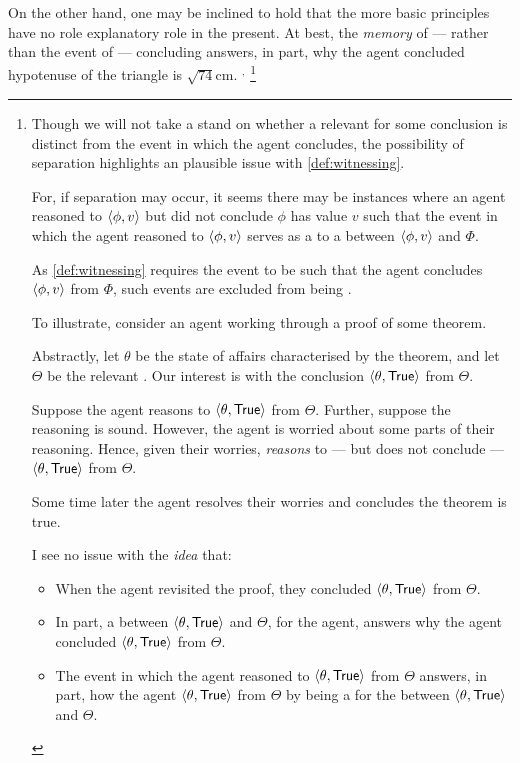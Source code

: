 \begin{note}
{    On the other hand, one may be inclined to hold that the more basic principles have no role explanatory role in the present.
    At best, the \agents{} \emph{memory} of --- rather than the event of --- concluding answers, in part, why the agent concluded hypotenuse of the triangle is \(\sqrt{74}\text{cm}\).
  }%
  \(^{,}\)%
  \footnote{
  Though we will not take a stand on whether a relevant  for some conclusion is distinct from the event in which the agent concludes, the possibility of separation highlights an plausible issue with \autoref{def:witnessing}.

  For, if separation may occur, it seems there may be instances where an agent reasoned to \(\langle \phi, v \rangle\) but did not conclude \(\phi\) has value \(v\) such that the event in which the agent reasoned to \(\langle \phi, v \rangle\) serves as a  to a \ros{} between \(\langle \phi, v \rangle\) and \(\Phi\).

  As \autoref{def:witnessing} requires the event to be such that the agent concludes \(\langle \phi, v \rangle\) from \(\Phi\), such events are excluded from being .

  To illustrate, consider an agent working through a proof of some theorem.

  Abstractly, let \(\theta\) be the state of affairs characterised by the theorem, and let \(\Theta\) be the relevant \pool{}.
  Our interest is with the conclusion \(\langle \theta, \text{\textsf{True}} \rangle\) from \(\Theta\).

  Suppose the agent reasons to \(\langle \theta, \text{\textsf{True}} \rangle\) from \(\Theta\).
  Further, suppose the \agents{} reasoning is sound.
  However, the agent is worried about some parts of their reasoning.
  Hence, given their worries, \emph{reasons} to --- but does not conclude --- \(\langle \theta, \text{\textsf{True}} \rangle\) from \(\Theta\).

  Some time later the agent resolves their worries and concludes the theorem is true.

  I see no issue with the \emph{idea} that:
  \begin{itemize}[noitemsep]
  \item
    When the agent revisited the proof, they concluded \(\langle \theta, \text{\textsf{True}} \rangle\) from \(\Theta\).
  \item
    In part, a \ros{} between \(\langle \theta, \text{\textsf{True}} \rangle\) and \(\Theta\), for the agent, answers why the agent concluded \(\langle \theta, \text{\textsf{True}} \rangle\) from \(\Theta\).
  \item
    The event in which the agent reasoned to \(\langle \theta, \text{\textsf{True}} \rangle\) from \(\Theta\) answers, in part, how the agent \(\langle \theta, \text{\textsf{True}} \rangle\) from \(\Theta\) by being a \wit{} for the \ros{} between \(\langle \theta, \text{\textsf{True}} \rangle\) and \(\Theta\).
  \end{itemize}

}
\end{note}
